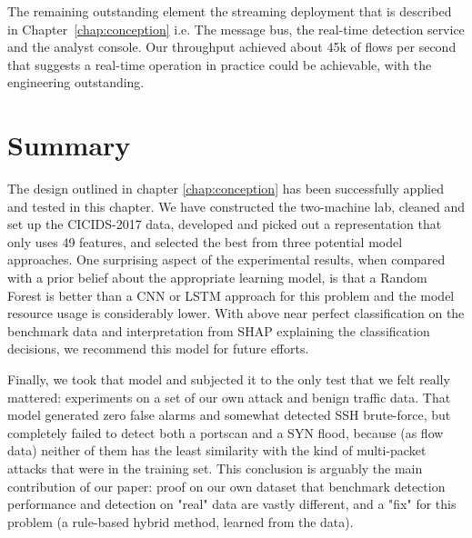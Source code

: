 The remaining outstanding element the streaming deployment that is described in Chapter~\ref{chap:conception} i.e. The message bus, the real-time detection service and the analyst console. Our throughput achieved about 45k of flows per second that suggests a real-time operation in practice could be achievable, with the engineering outstanding.

\section{Summary}
\label{sec:results_summary}

The design outlined in chapter \ref{chap:conception} has been successfully applied and tested in this chapter. We have constructed the two-machine lab, cleaned and set up the CICIDS-2017 data, developed and picked out a representation that only uses 49 features, and selected the best from three potential model approaches. One surprising aspect of the experimental results, when compared with a prior belief about the appropriate learning model, is that a Random Forest is better than a CNN or LSTM approach for this problem and the model resource usage is considerably lower. With above near perfect classification on the benchmark data and interpretation from SHAP explaining the classification decisions, we recommend this model for future efforts.

Finally, we took that model and subjected it to the only test that we felt really mattered: experiments on a set of our own attack and benign traffic data. That model generated zero false alarms and somewhat detected SSH brute-force, but completely failed to detect both a portscan and a SYN flood, because (as flow data) neither of them has the least similarity with the kind of multi-packet attacks that were in the training set. This conclusion is arguably the main contribution of our paper: proof on our own dataset that benchmark detection performance and detection on "real" data are vastly different, and a "fix" for this problem (a rule-based hybrid method, learned from the data).
